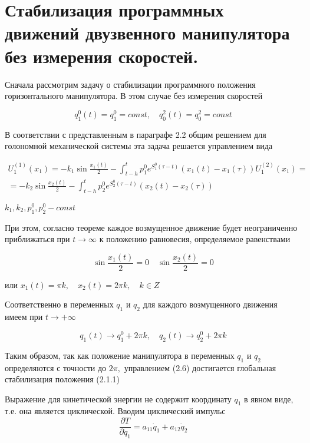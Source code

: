 \section{Стабилизация программных движений двузвенного манипулятора без измерения скоростей.} \label{p22}

Сначала рассмотрим задачу о стабилизации программного положения горизонтального манипулятора. В этом случае без измерения скоростей 

\begin{equation}
q^0_1 (t) = q^0_1 = const, \quad q^2_0 (t) = q^2_0 = const
\end{equation}

В соответствии с представленным в параграфе 2.2 общим решением для голономной механической системы эта задача решается управлением вида 

\begin{equation} \label{2.6'}
\begin{array}{c}
\displaystyle U^{(1)}_1 (x_1) = - k_1 \sin \frac{x_1(t)}{2} - \int_{t-h}^t p_1^0 e^{S_1^0 (\tau - t)} (x_1 (t) - x_1 (\tau)) U^{(2)}_1 (x_1) =\\
\displaystyle = - k_2 \sin \frac{x_2(t)}{2} - \int_{t-h}^t p_2^0 e^{S_2^0 (\tau - t)} (x_2 (t) - x_2 (\tau))
\end{array}
\end{equation}

$k_1, k_2, p_1^0, p_2^0 - const$

При этом, согласно теореме каждое возмущенное движение будет неограниченно приближаться при $t \to \infty$ к положению равновесия, определяемое равенствами 

$$\sin \frac{x_1(t)}{2} = 0 \quad \sin \frac{x_2(t)}{2} = 0$$

или $x_1(t) = \pi k, \quad x_2(t) = 2 \pi k, \quad k \in Z$

Соответственно в переменных $q_1$ и $q_2$ для каждого возмущенного движения имеем при $t \to +\infty$ 

\begin{equation}
q_1 (t) \to q_1^0 + 2 \pi k, \quad q_2(t) \to q_2^0 + 2 \pi k
\end{equation}


Таким образом, так как положение манипулятора в переменных $q_1$ и $q_2$ определяются с точности до $2 \pi,$ управлением (2.6) достигается глобальная стабилизация положения (2.1.1)

Выражение для кинетической энергии не содержит координату $q_1$ в явном виде, т.е. она является циклической. Вводим циклический импульс $$\frac{\partial T}{\partial \dot q_1} = a_{11} \dot q_1 + a_{12} \dot q_2$$


